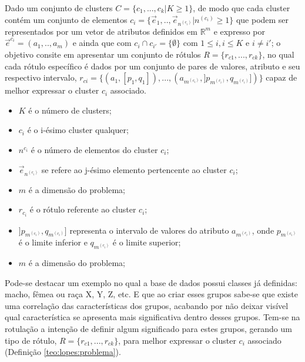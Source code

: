     \begin{teorema}
    Dado um conjunto de clusters ${C=\{c_1,...,c_k | K \geqslant 1\} }$, de modo que cada cluster contém um conjunto de elementos ${c_i=\{\vec{e}_1,..,\vec{e}_{n^{(c_i)}}|n^{(c_i)} \geqslant 1 \}}$ que podem ser representados por um vetor de atributos definidos em ${\mathbb{R}^m }$ e expresso por ${ \vec{e}^{c_i}=(a_1,..,a_m)  }$ e ainda que  com ${ c_i \cap c_{i'}=\{\emptyset\} }$ com ${ 1 \leqslant i, i \leqslant K  }$ e ${ i \neq i' }$; o objetivo consite em apresentar um conjunto de rótulos ${ R=\{ r_{c1},...,r_{ck} \} }$, no qual cada rótulo específico é dados por um conjunto de pares de valores, atributo e seu respectivo intervalo, ${ r_{ci}=\{ (a_1,[p_1,q_1]),...,(a_{m^{(c_i)}}, ]p_{m^{(c_i)}},q_{m^{(c_i)}}]) \} }$ capaz de melhor expressar o cluster ${c_i}$ associado.
        \begin{itemize}[noitemsep]
            \item ${K}$ é o número de clusters;
            \item ${c_i}$ é o i-ésimo cluster qualquer;
            \item ${n^{c_i}}$ é o número de elementos do cluster ${c_i}$;
            \item ${\vec{e}_{n^{(c_i)}}}$ se refere ao j-ésimo elemento pertencente ao cluster ${c_i}$;
            \item ${m}$ é a dimensão do problema;
            \item ${r_{c_i}}$ é o rótulo referente ao cluster ${c_i}$;
            \item ${]p_{m^{(c_i)}},q_{m^{(c_i)}}]}$ representa o intervalo de valores do atributo ${a_{m^{(c_i)}} }$, onde ${ p_{m^{(c_i)}} }$  é o limite inferior e ${ q_{m^{(c_i)}} }$ é o limite superior;
            \item ${m}$ é a dimensão do problema;
        \end{itemize}
    \label{teo:lopes:problema}
    \end{teorema}

Pode-se destacar um exemplo no qual a base de dados possui classes já definidas: macho, fêmea ou raça X, Y, Z, etc. E que ao criar esses grupos sabe-se que existe uma correlação das características dos grupos, acabando por não deixar visível qual característica se apresenta mais significativa dentro desses grupos. Tem-se na rotulação a intenção de definir algum significado para estes grupos, gerando um tipo de rótulo, ${ R=\{ r_{c1},...,r_{ck} \} }$, para melhor expressar o cluster ${c_i}$ associado (Definição \ref{teo:lopes:problema}).

